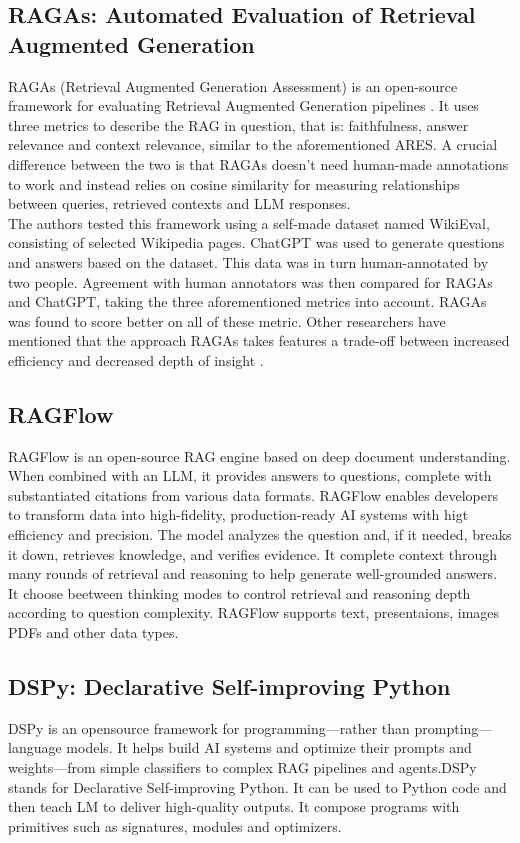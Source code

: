 \documentclass[11pt]{article}
\begin{document}
\subsection{RAGAs: Automated Evaluation of Retrieval Augmented Generation}

RAGAs (Retrieval Augmented Generation Assessment) is an open-source framework for evaluating Retrieval Augmented Generation pipelines \cite{ragas}. It uses three metrics to describe the RAG in question, that is: faithfulness, answer relevance and context relevance, similar to the aforementioned ARES. A crucial difference between the two is that RAGAs doesn't need human-made annotations to work and instead relies on cosine similarity for measuring relationships between queries, retrieved contexts and LLM responses. \\The authors tested this framework using a self-made dataset named WikiEval, consisting of selected Wikipedia pages. ChatGPT was used to generate questions and answers based on the dataset. This data was in turn human-annotated by two people. Agreement with human annotators was then compared for RAGAs and ChatGPT, taking the three aforementioned metrics into account. RAGAs was found to score better on all of these metric. Other researchers have mentioned that the approach RAGAs takes features a trade-off between increased efficiency and decreased depth of insight \cite{brown2025}.

\subsection{RAGFlow}
RAGFlow is an open-source RAG engine based on deep document understanding. When combined with an LLM, it provides answers to questions, complete with substantiated citations from various data formats. RAGFlow enables developers to transform data into high-fidelity, production-ready AI systems with higt efficiency and precision. The model analyzes the question and, if it needed, breaks it down, retrieves knowledge, and verifies evidence. It complete context through many rounds of retrieval and reasoning to help generate well-grounded answers. It choose beetween thinking modes to control retrieval and reasoning depth according to question complexity. RAGFlow supports text, presentaions, images PDFs and other data types.

\subsection{DSPy: Declarative Self-improving Python}
DSPy is an opensource framework for programming—rather than prompting—language models.
It helps build AI systems and optimize their prompts and weights—from simple classifiers to complex RAG pipelines and agents.DSPy stands for Declarative Self-improving Python. It can be used to Python code and then teach LM to deliver high-quality outputs. It compose programs with  primitives such as signatures, modules and optimizers.
\end{document}
